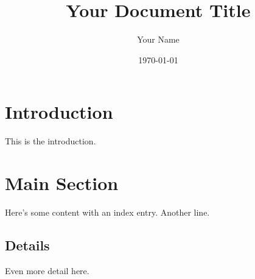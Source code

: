 \documentclass[12pt,a5paper]{article}
\title{Your Document Title}
\author{Your Name}
\date{\today}
\begin{document}
\maketitle

\tableofcontents
\newpage

\section{Introduction}
This is the introduction. 🌟

\section{Main Section}
Here's some content with an index entry.
Another line. 🌸

\subsection{Details}
Even more detail here. 📝

\newpage
\printbibliography

\newpage
\printindex
\end{document}
